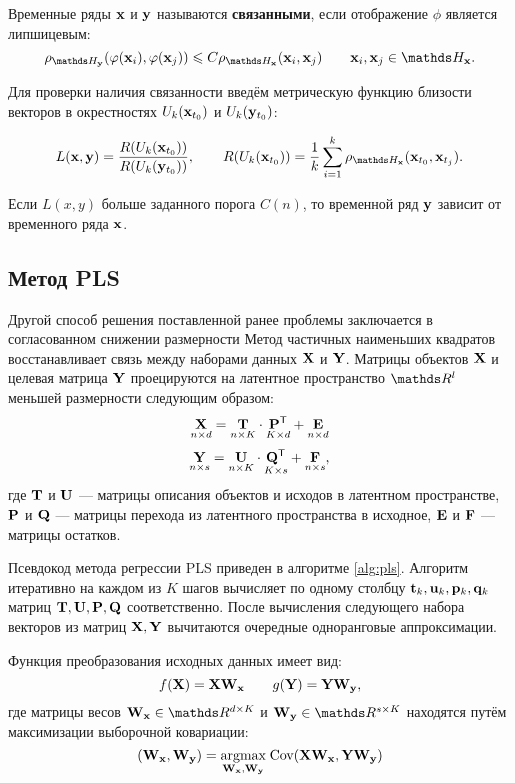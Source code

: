\documentclass[a4paper, 12pt]{article}
\begin{document}
\begin{definition}
	Временные ряды $\mathbf{x}$ и $\mathbf{y}$ называются \textbf{связанными}, если отображение $\phi$ является липшицевым:
	$$ \rho_{\dH_{\by}}(\phi(\bx_i), \phi(\bx_j)) \leq C \rho_{\dH_{\bx}}(\bx_i, \bx_j) \qquad \bx_i, \bx_j \in \dH_{\bx}. $$
\end{definition}

Для проверки наличия связанности введём метрическую функцию близости векторов в окрестностях $U_k(\mathbf{x}_{t_0})$ и $U_k(\mathbf{y}_{t_0})$:

\begin{equation}
	L(\bx, \by) = \dfrac{R(U_k(\bx_{t_0}))}{R(U_k(\by_{t_0}))}, \qquad R(U_k(\bx_{t_0})) = \dfrac{1}{k} \sum\limits_{i=1}^k \rho_{\dH_{\bx}}(\bx_{t_0}, \bx_{t_j}).
\end{equation}

Если $L(x, y)$ больше заданного порога $C(n)$, то временной ряд $\mathbf{y}$ зависит от временного ряда $\mathbf{x}$.

\subsection{Метод PLS}
Другой способ решения поставленной ранее проблемы заключается в согласованном снижении размерности
Метод частичных наименьших квадратов восстанавливает связь между наборами данных $\mathbf{X}$ и $\mathbf{Y}$. 
Матрицы объектов $\mathbf{X}$ и целевая матрица $\mathbf{Y}$ проецируются на латентное пространство $\dR^l$ меньшей размерности следующим образом:
$$ \underset{n \times d}{\mathbf{X}} = \underset{n \times K}{\mathbf{T}} \cdot \underset{K \times d}{\mathbf{P}^{\mathsf{T}}} + \underset{n \times d}{\mathbf{E}} $$
$$ \underset{n \times s}{\mathbf{Y}} = \underset{n \times K}{\mathbf{U}} \cdot \underset{K \times s}{\mathbf{Q}^{\mathsf{T}}} + \underset{n \times s}{\mathbf{F}}, $$
где $\mathbf{T}$ и $\mathbf{U}$ --- матрицы описания объектов и исходов в латентном пространстве, $\mathbf{P}$ и $\mathbf{Q}$ --- матрицы перехода из латентного пространства в исходное, $\mathbf{E}$ и $\mathbf{F}$ --- матрицы остатков.

Псевдокод метода регрессии PLS приведен в алгоритме \ref{alg:pls}. Алгоритм итеративно на каждом из $K$ шагов вычисляет по одному столбцу $\mathbf{t}_k, \mathbf{u}_k, \mathbf{p}_k, \mathbf{q}_k$ матриц $\mathbf{T}, \mathbf{U}, \mathbf{P}, \mathbf{Q}$ соответственно. После вычисления следующего набора векторов из матриц $\mathbf{X}, \mathbf{Y}$ вычитаются очередные одноранговые аппроксимации.

Функция преобразования исходных данных имеет вид: 
$$ f(\mathbf{X}) = \mathbf{X}\mathbf{W}_{\mathbf{x}} \qquad g(\mathbf{Y}) = \mathbf{Y}\mathbf{W}_{\mathbf{y}}, $$ 
где матрицы весов $\bW_{\bx} \in \dR^{d \times K}$ и $\bW_{\by} \in \dR^{s \times K}$ находятся путём максимизации выборочной ковариации:
$$ (\mathbf{W}_{\mathbf{x}}, \mathbf{W}_{\mathbf{y}}) = \underset{\mathbf{W}_{\mathbf{x}}, \mathbf{W}_{\mathbf{y}}}{\text{argmax}}\; \text{Cov}(\mathbf{X}\mathbf{W}_{\mathbf{x}}, \mathbf{Y}\mathbf{W}_{\mathbf{y}})$$
\end{document}
